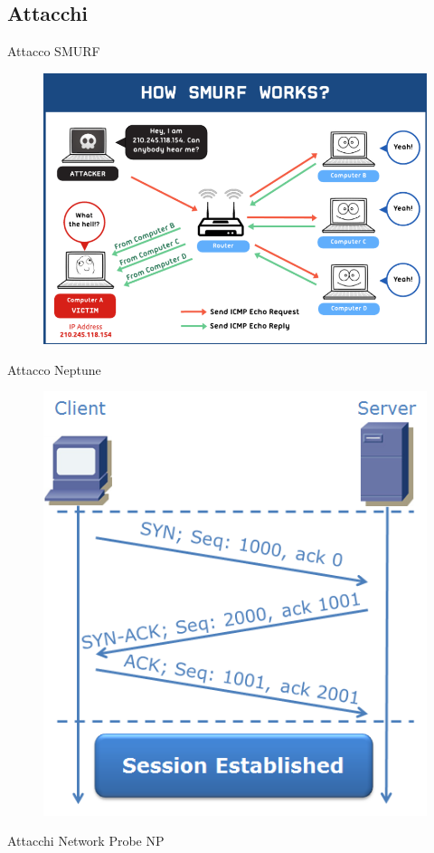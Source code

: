 \documentclass[xcolor={dvipsnames}]{beamer}%
\begin{document}
	\subsection{Attacchi}
		\begin{frame}{Attacco SMURF}
			\begin{figure}
				\begin{center}
					\includegraphics[width=.75\textwidth]{smurf}
				\end{center}
			\end{figure}
		\end{frame}
		\begin{frame}{Attacco Neptune}
			\begin{figure}
				\begin{center}
					\includegraphics[width=.5\textwidth]{3wayh}
				\end{center}
			\end{figure}
		\end{frame}
		
		\begin{frame}{Attacchi Network Probe}
			NP
		\end{frame}
	
\end{document}

